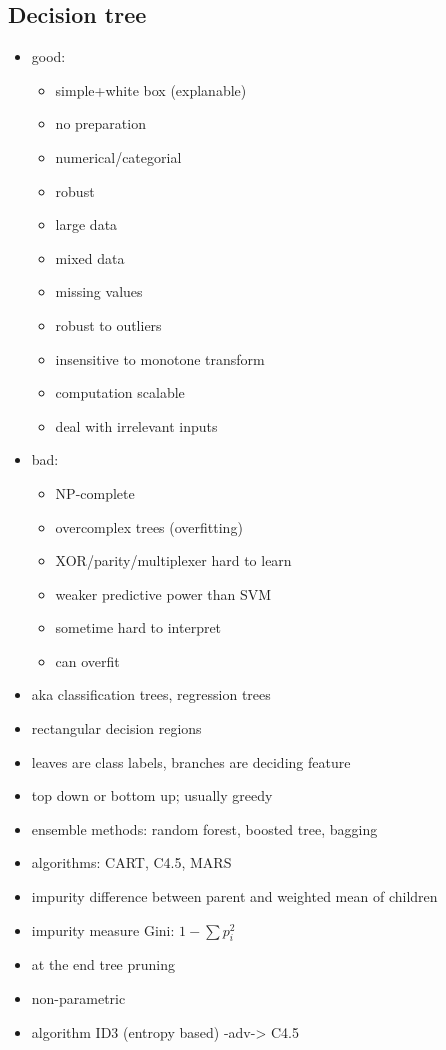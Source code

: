 \documentclass{article}
\begin{document}
\begin{multicols}{3}
\section{Decision tree}
\begin{itemize}
\item good:
\begin{itemize}
  \item simple+white box (explanable)
  \item no preparation
  \item numerical/categorial
  \item robust
  \item large data
  \item mixed data
  \item missing values
  \item robust to outliers
  \item insensitive to monotone transform
  \item computation scalable
  \item deal with irrelevant inputs
\end{itemize}
\item bad:
\begin{itemize}
  \item NP-complete
  \item overcomplex trees (overfitting)
  \item XOR/parity/multiplexer hard to learn
  \item weaker predictive power than SVM
  \item sometime hard to interpret
  \item can overfit  
\end{itemize}
\item aka classification trees, regression trees
\item rectangular decision regions
\item leaves are class labels, branches are deciding feature
\item top down or bottom up; usually greedy
\item ensemble methods: random forest, boosted tree, bagging
\item algorithms: CART, C4.5, MARS
\item impurity difference between parent and weighted mean of children
\item impurity measure Gini: $1-\sum p_i^2$
\item at the end tree pruning
\item non-parametric
\item algorithm ID3 (entropy based) -adv-> C4.5
\end{itemize}


\end{multicols}
\end{document}
